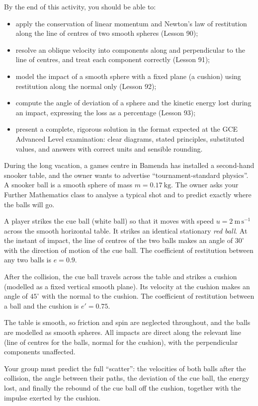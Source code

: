 \documentclass[11pt]{article}
\newcommand{\cle}[1]{{\popxbold\color{popdark}#1}}
\newcounter{popsec}
\newcounter{popsub}
\newcommand{\courssub}[1]{%
  \stepcounter{popsub}%
  \par\vspace{9pt}\noindent{\popxbold\fontsize{11.5}{13}\selectfont\color{popink}{\color{poporange}\thepopsec.\thepopsub}\hspace{6pt}#1}\par\nopagebreak\vspace{4pt}
}
\begin{document}
\courssub{Aims of the Activity}
\begin{aretenir}
By the end of this activity, you should be able to:
\begin{itemize}
\item apply the \cle{conservation of linear momentum} and \cle{Newton's law of restitution} along the line of centres of two smooth spheres (Lesson 90);
\item resolve an oblique velocity into components along and perpendicular to the line of centres, and treat each component correctly (Lesson 91);
\item model the impact of a smooth sphere with a fixed plane (a cushion) using restitution along the normal only (Lesson 92);
\item compute the \cle{angle of deviation} of a sphere and the \cle{kinetic energy lost} during an impact, expressing the loss as a percentage (Lesson 93);
\item present a complete, rigorous solution in the format expected at the GCE Advanced Level examination: clear diagrams, stated principles, substituted values, and answers with correct units and sensible rounding.
\end{itemize}
\end{aretenir}

\begin{experience}
During the long vacation, a games centre in Bamenda has installed a second-hand snooker table, and the owner wants to advertise ``tournament-standard physics''. A snooker ball is a smooth sphere of mass $m = 0.17\ \mathrm{kg}$. The owner asks your Further Mathematics class to analyse a typical shot and to predict exactly where the balls will go.

A player strikes the \cle{cue ball} (white ball) so that it moves with speed $u = 2\ \mathrm{m\,s^{-1}}$ across the smooth horizontal table. It strikes an identical stationary \emph{red ball}. At the instant of impact, the \cle{line of centres} of the two balls makes an angle of $30^{\circ}$ with the direction of motion of the cue ball. The coefficient of restitution between any two balls is $e = 0.9$.

After the collision, the cue ball travels across the table and strikes a cushion (modelled as a fixed vertical smooth plane). Its velocity at the cushion makes an angle of $45^{\circ}$ with the normal to the cushion. The coefficient of restitution between a ball and the cushion is $e' = 0.75$.

The table is smooth, so friction and spin are neglected throughout, and the balls are modelled as smooth spheres. All impacts are direct along the relevant line (line of centres for the balls, normal for the cushion), with the perpendicular components unaffected.

Your group must predict the full ``scatter'': the velocities of both balls after the collision, the angle between their paths, the deviation of the cue ball, the energy lost, and finally the rebound of the cue ball off the cushion, together with the impulse exerted by the cushion.
\end{experience}
\end{document}

